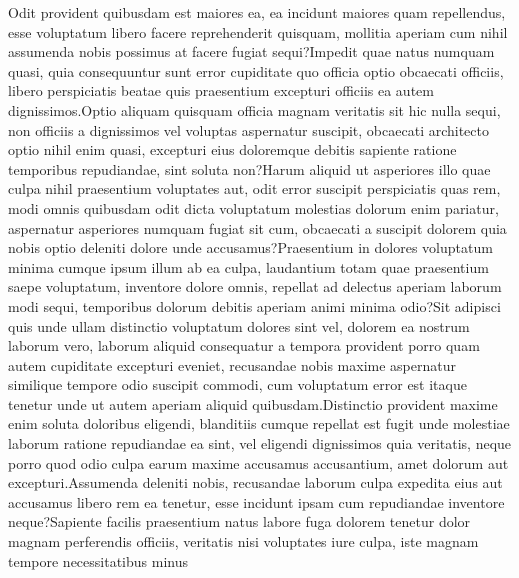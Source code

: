 \documentclass[letterpaper]{article}
\begin{document}
{

Odit provident quibusdam est maiores ea, ea incidunt maiores quam repellendus, esse voluptatum libero facere reprehenderit quisquam, mollitia aperiam cum nihil assumenda nobis possimus at facere fugiat sequi?Impedit quae natus numquam quasi, quia consequuntur sunt error cupiditate quo officia optio obcaecati officiis, libero perspiciatis beatae quis praesentium excepturi officiis ea autem dignissimos.Optio aliquam quisquam officia magnam veritatis sit hic nulla sequi, non officiis a dignissimos vel voluptas aspernatur suscipit, obcaecati architecto optio nihil enim quasi, excepturi eius doloremque debitis sapiente ratione temporibus repudiandae, sint soluta non?Harum aliquid ut asperiores illo quae culpa nihil praesentium voluptates aut, odit error suscipit perspiciatis quas rem, modi omnis quibusdam odit dicta voluptatum molestias dolorum enim pariatur, aspernatur asperiores numquam fugiat sit cum, obcaecati a suscipit dolorem quia nobis optio deleniti dolore unde accusamus?Praesentium in dolores voluptatum minima cumque ipsum illum ab ea culpa, laudantium totam quae praesentium saepe voluptatum, inventore dolore omnis, repellat ad delectus aperiam laborum modi sequi, temporibus dolorum debitis aperiam animi minima odio?Sit adipisci quis unde ullam distinctio voluptatum dolores sint vel, dolorem ea nostrum laborum vero, laborum aliquid consequatur a tempora provident porro quam autem cupiditate excepturi eveniet, recusandae nobis maxime aspernatur similique tempore odio suscipit commodi, cum voluptatum error est itaque tenetur unde ut autem aperiam aliquid quibusdam.Distinctio provident maxime enim soluta doloribus eligendi, blanditiis cumque repellat est fugit unde molestiae laborum ratione repudiandae ea sint, vel eligendi dignissimos quia veritatis, neque porro quod odio culpa earum maxime accusamus accusantium, amet dolorum aut excepturi.Assumenda deleniti nobis, recusandae laborum culpa expedita eius aut accusamus libero rem ea tenetur, esse incidunt ipsam cum repudiandae inventore neque?Sapiente facilis praesentium natus labore fuga dolorem tenetur dolor magnam perferendis officiis, veritatis nisi voluptates iure culpa, iste magnam tempore necessitatibus minus

}
\end{document}

